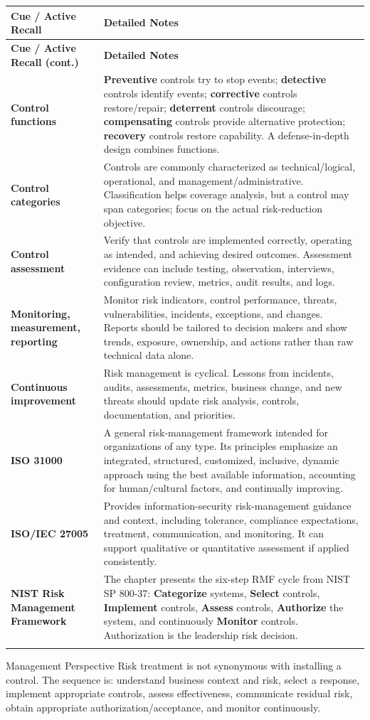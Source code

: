 \documentclass[10pt,letterpaper]{article}
\makeatletter
\newenvironment{cornell}
{\rowcolors{2}{white}{notebg}\begin{longtable}{@{}>{\raggedright\arraybackslash\columncolor{cuebg}\color{navy}\bfseries}p{0.285\textwidth}>{\raggedright\arraybackslash}p{0.65\textwidth}@{}}
\rowcolor{navy}\color{white}\textbf{Cue / Active Recall} & \color{white}\textbf{Detailed Notes}\\ \hline
\endfirsthead
\rowcolor{navy}\color{white}\textbf{Cue / Active Recall (cont.)} & \color{white}\textbf{Detailed Notes}\\ \hline
\endhead}
{\end{longtable}}
\newcommand{\noterow}[2]{#1 & #2\\\arrayrulecolor{line}\hline}
\makeatother
\begin{document}
\begin{cornell}
\noterow{Control functions}{\textbf{Preventive} controls try to stop events; \textbf{detective} controls identify events; \textbf{corrective} controls restore/repair; \textbf{deterrent} controls discourage; \textbf{compensating} controls provide alternative protection; \textbf{recovery} controls restore capability. A defense-in-depth design combines functions.}
\noterow{Control categories}{Controls are commonly characterized as technical/logical, operational, and management/administrative. Classification helps coverage analysis, but a control may span categories; focus on the actual risk-reduction objective.}
\noterow{Control assessment}{Verify that controls are implemented correctly, operating as intended, and achieving desired outcomes. Assessment evidence can include testing, observation, interviews, configuration review, metrics, audit results, and logs.}
\noterow{Monitoring, measurement, reporting}{Monitor risk indicators, control performance, threats, vulnerabilities, incidents, exceptions, and changes. Reports should be tailored to decision makers and show trends, exposure, ownership, and actions rather than raw technical data alone.}
\noterow{Continuous improvement}{Risk management is cyclical. Lessons from incidents, audits, assessments, metrics, business change, and new threats should update risk analysis, controls, documentation, and priorities.}
\noterow{ISO 31000}{A general risk-management framework intended for organizations of any type. Its principles emphasize an integrated, structured, customized, inclusive, dynamic approach using the best available information, accounting for human/cultural factors, and continually improving.}
\noterow{ISO/IEC 27005}{Provides information-security risk-management guidance and context, including tolerance, compliance expectations, treatment, communication, and monitoring. It can support qualitative or quantitative assessment if applied consistently.}
\noterow{NIST Risk Management Framework}{The chapter presents the six-step RMF cycle from NIST SP 800-37: \textbf{Categorize} systems, \textbf{Select} controls, \textbf{Implement} controls, \textbf{Assess} controls, \textbf{Authorize} the system, and continuously \textbf{Monitor} controls. Authorization is the leadership risk decision.}
\end{cornell}

\begin{exambox}{Management Perspective}
Risk treatment is not synonymous with installing a control. The sequence is: understand business context and risk, select a response, implement appropriate controls, assess effectiveness, communicate residual risk, obtain appropriate authorization/acceptance, and monitor continuously.
\end{exambox}
\end{document}
